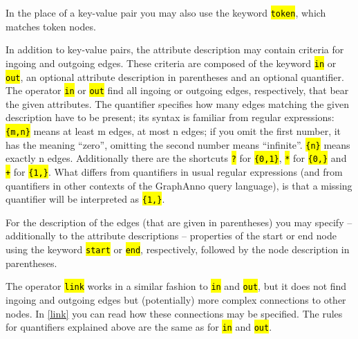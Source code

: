 \documentclass[12pt]{scrartcl}
\newcommand{\code}[1]{\hl{\texttt{#1}}}
\begin{document}
In the place of a key-value pair you may also use the keyword \code{token}, which matches token nodes.

\label{quantifiers}In addition to key-value pairs, the attribute description may contain criteria for ingoing and outgoing edges.
These criteria are composed of the keyword \code{in} or \code{out}, an optional attribute description in parentheses and an optional quantifier.
The operator \code{in} or \code{out} find all ingoing or outgoing edges, respectively, that bear the given attributes.
The quantifier specifies how many edges matching the given description have to be present; its syntax is familiar from regular expressions:
\code{\{m,n\}} means at least m edges, at most n edges; if you omit the first number, it has the meaning “zero”, omitting the second number means “infinite”.
\code{\{n\}} means exactly n edges.
Additionally there are the shortcuts \code{?} for \code{\{0,1\}}, \code{*} for \code{\{0,\}} and \code{+} for \code{\{1,\}}.
What differs from quantifiers in usual regular expressions (and from quantifiers in other contexts of the GraphAnno query language), is that a missing quantifier will be interpreted as \code{\{1,\}}.

For the description of the edges (that are given in parentheses) you may specify – additionally to the attribute descriptions – properties of the start or end node using the keyword \code{start} or \code{end}, respectively, followed by the node description in parentheses.

The operator \code{link} works in a similar fashion to \code{in} and \code{out}, but it does not find ingoing and outgoing edges but (potentially) more complex connections to other nodes.
In \ref{link} you can read how these connections may be specified.
The rules for quantifiers explained above are the same as for \code{in} and \code{out}.
\end{document}
